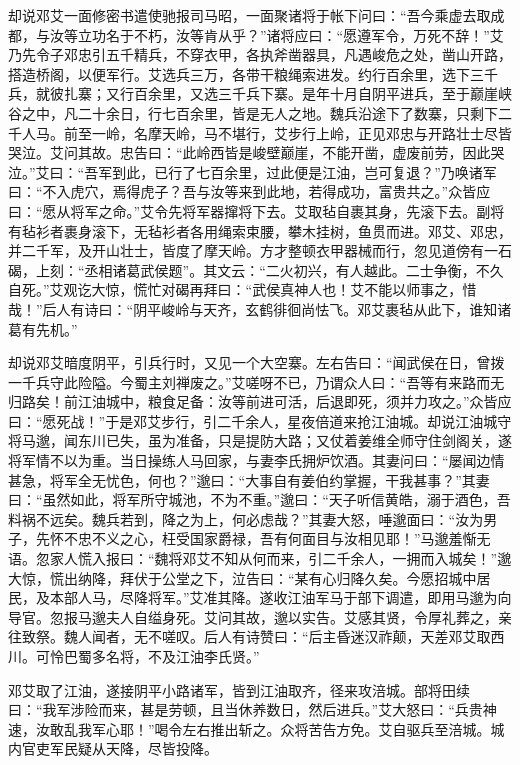 却说邓艾一面修密书遣使驰报司马昭，一面聚诸将于帐下问曰：“吾今乘虚去取成都，与汝等立功名于不朽，汝等肯从乎？”诸将应曰：“愿遵军令，万死不辞！”艾乃先令子邓忠引五千精兵，不穿衣甲，各执斧凿器具，凡遇峻危之处，凿山开路，搭造桥阁，以便军行。艾选兵三万，各带干粮绳索进发。约行百余里，选下三千兵，就彼扎寨；又行百余里，又选三千兵下寨。是年十月自阴平进兵，至于巅崖峡谷之中，凡二十余日，行七百余里，皆是无人之地。魏兵沿途下了数寨，只剩下二千人马。前至一岭，名摩天岭，马不堪行，艾步行上岭，正见邓忠与开路壮士尽皆哭泣。艾问其故。忠告曰：“此岭西皆是峻壁巅崖，不能开凿，虚废前劳，因此哭泣。”艾曰：“吾军到此，已行了七百余里，过此便是江油，岂可复退？”乃唤诸军曰：“不入虎穴，焉得虎子？吾与汝等来到此地，若得成功，富贵共之。”众皆应曰：“愿从将军之命。”艾令先将军器撺将下去。艾取毡自裹其身，先滚下去。副将有毡衫者裹身滚下，无毡衫者各用绳索束腰，攀木挂树，鱼贯而进。邓艾、邓忠，并二千军，及开山壮士，皆度了摩天岭。方才整顿衣甲器械而行，忽见道傍有一石碣，上刻：“丞相诸葛武侯题”。其文云：“二火初兴，有人越此。二士争衡，不久自死。”艾观讫大惊，慌忙对碣再拜曰：“武侯真神人也！艾不能以师事之，惜哉！”后人有诗曰：“阴平峻岭与天齐，玄鹤徘徊尚怯飞。邓艾裹毡从此下，谁知诸葛有先机。”

却说邓艾暗度阴平，引兵行时，又见一个大空寨。左右告曰：“闻武侯在日，曾拨一千兵守此险隘。今蜀主刘禅废之。”艾嗟呀不已，乃谓众人曰：“吾等有来路而无归路矣！前江油城中，粮食足备：汝等前进可活，后退即死，须并力攻之。”众皆应曰：“愿死战！”于是邓艾步行，引二千余人，星夜倍道来抢江油城。却说江油城守将马邈，闻东川已失，虽为准备，只是提防大路；又仗着姜维全师守住剑阁关，遂将军情不以为重。当日操练人马回家，与妻李氏拥炉饮酒。其妻问曰：“屡闻边情甚急，将军全无忧色，何也？”邈曰：“大事自有姜伯约掌握，干我甚事？”其妻曰：“虽然如此，将军所守城池，不为不重。”邈曰：“天子听信黄皓，溺于酒色，吾料祸不远矣。魏兵若到，降之为上，何必虑哉？”其妻大怒，唾邈面曰：“汝为男子，先怀不忠不义之心，枉受国家爵禄，吾有何面目与汝相见耶！”马邈羞惭无语。忽家人慌入报曰：“魏将邓艾不知从何而来，引二千余人，一拥而入城矣！”邈大惊，慌出纳降，拜伏于公堂之下，泣告曰：“某有心归降久矣。今愿招城中居民，及本部人马，尽降将军。”艾准其降。遂收江油军马于部下调遣，即用马邈为向导官。忽报马邈夫人自缢身死。艾问其故，邈以实告。艾感其贤，令厚礼葬之，亲往致祭。魏人闻者，无不嗟叹。后人有诗赞曰：“后主昏迷汉祚颠，天差邓艾取西川。可怜巴蜀多名将，不及江油李氏贤。”

邓艾取了江油，遂接阴平小路诸军，皆到江油取齐，径来攻涪城。部将田续曰：“我军涉险而来，甚是劳顿，且当休养数日，然后进兵。”艾大怒曰：“兵贵神速，汝敢乱我军心耶！”喝令左右推出斩之。众将苦告方免。艾自驱兵至涪城。城内官吏军民疑从天降，尽皆投降。

